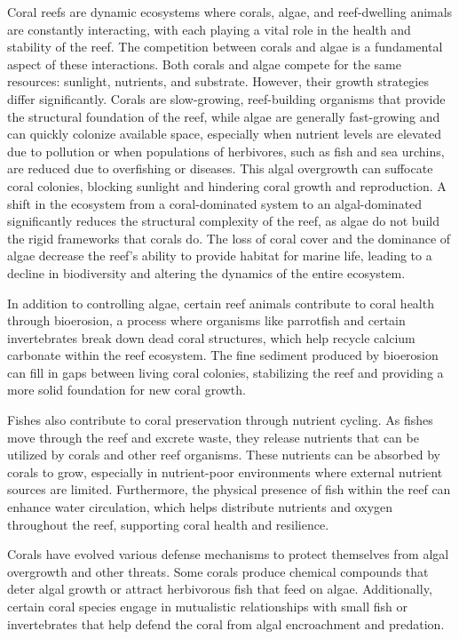 Coral reefs are dynamic ecosystems where corals, algae, and reef-dwelling animals are constantly interacting, with each playing a vital role in the health and stability of the reef. The competition between corals and algae is a fundamental aspect of these interactions. Both corals and algae compete for the same resources: sunlight, nutrients, and substrate. However, their growth strategies differ significantly. Corals are slow-growing, reef-building organisms that provide the structural foundation of the reef, while algae are generally fast-growing and can quickly colonize available space, especially when nutrient levels are elevated due to pollution or when populations of herbivores, such as fish and sea urchins, are reduced due to overfishing or diseases. This algal overgrowth can suffocate coral colonies, blocking sunlight and hindering coral growth and reproduction. A shift in the ecosystem from a coral-dominated system to an algal-dominated significantly reduces the structural complexity of the reef, as algae do not build the rigid frameworks that corals do. The loss of coral cover and the dominance of algae decrease the reef's ability to provide habitat for marine life, leading to a decline in biodiversity and altering the dynamics of the entire ecosystem.

In addition to controlling algae, certain reef animals contribute to coral health through bioerosion, a process where organisms like parrotfish and certain invertebrates break down dead coral structures, which help recycle calcium carbonate within the reef ecosystem. The fine sediment produced by bioerosion can fill in gaps between living coral colonies, stabilizing the reef and providing a more solid foundation for new coral growth. 

Fishes also contribute to coral preservation through nutrient cycling. As fishes move through the reef and excrete waste, they release nutrients that can be utilized by corals and other reef organisms. These nutrients can be absorbed by corals to grow, especially in nutrient-poor environments where external nutrient sources are limited. Furthermore, the physical presence of fish within the reef can enhance water circulation, which helps distribute nutrients and oxygen throughout the reef, supporting coral health and resilience.

Corals have evolved various defense mechanisms to protect themselves from algal overgrowth and other threats. Some corals produce chemical compounds that deter algal growth or attract herbivorous fish that feed on algae. Additionally, certain coral species engage in mutualistic relationships with small fish or invertebrates that help defend the coral from algal encroachment and predation.

